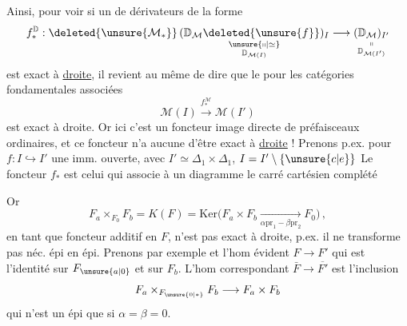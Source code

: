 Ainsi, pour voir si un   de dérivateurs de la forme
\[
f^{\mathbb D}_*:\deleted{\unsure{\mathcal M_*}}\,
\underset{\substack{\unsure{\shortparallel|\simeq}\\\mathbb D_{\mathcal M(I)}}}{(\mathbb D_{\mathcal M}\deleted{\unsure{f}})_I}
\longrightarrow
\underset{\substack{\shortparallel\\\mathbb D_{\mathcal M(I')}}}{(\mathbb D_{\mathcal M})_{I'}}
\]
est exact à \uline{droite}, il revient au même de dire
que le  pour les catégories fondamentales associées
\[
\mathcal M(I)\xrightarrow{f_*^{\mathcal M}}\mathcal M(I')
\]
est exact à droite. Or ici c'est un foncteur image directe de préfaisceaux ordinaires, et ce foncteur n'a aucune  d'être exact à \uline{droite} !
\margin{$!\ \shortparallel$}
 
Prenons p.ex. pour $f:I\hookrightarrow I'$ une imm. ouverte, avec $I'\simeq\Delta_1\times\Delta_1$, $I=I'\setminus\{\unsure{c|e}\}$ 
Le foncteur $f_*$ est celui qui associe à un diagramme
le carré cartésien complété

Or
\[
F_a\times_{F_0}F_b=K(F)=\mathrm{Ker}\big(F_a\times F_b\xrightarrow[\alpha\mathrm{pr}_1-\beta\mathrm{pr}_2]{}F_0\big)\,,
\]
en tant que foncteur additif en $F$, n'est pas exact à droite, p.ex. il ne transforme pas néc. épi en épi. Prenons par exemple
et l'hom évident $F\longrightarrow F'$ qui est l'identité sur
$F_{\unsure{a|0}}$ et sur $F_b$.  L'hom correspondant $\bar F\longrightarrow\overline{F'}$ est l'inclusion
\[
F_a\times_{F_{\unsure{0|*}}}F_b\longrightarrow F_a\times F_b
\]
qui n'est un épi que si $\alpha=\beta=0$.

